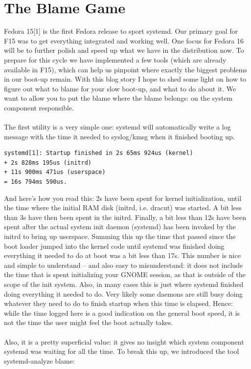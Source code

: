 \documentclass[titlepage]{article}
\begin{document}
\section{The Blame Game}
Fedora 15[1] is the first Fedora release to sport systemd. Our primary goal for F15 was to get everything integrated and working well. One focus for Fedora 16 will be to further polish and speed up what we have in the distribution now. To prepare for this cycle we have implemented a few tools (which are already available in F15), which can help us pinpoint where exactly the biggest problems in our boot-up remain. With this blog story I hope to shed some light on how to figure out what to blame for your slow boot-up, and what to do about it. We want to allow you to put the blame where the blame belongs: on the system component responsible.
\\
\\
The first utility is a very simple one: systemd will automatically write a log message with the time it needed to syslog/kmsg when it finished booting up.
\begin{lstlisting}
systemd[1]: Startup finished in 2s 65ms 924us (kernel) 
+ 2s 828ms 195us (initrd) 
+ 11s 900ms 471us (userspace) 
= 16s 794ms 590us.
\end{lstlisting}
And here's how you read this: 2s have been spent for kernel initialization, until the time where the initial RAM disk (initrd, i.e. dracut) was started. A bit less than 3s have then been spent in the initrd. Finally, a bit less than 12s have been spent after the actual system init daemon (systemd) has been invoked by the initrd to bring up userspace. Summing this up the time that passed since the boot loader jumped into the kernel code until systemd was finished doing everything it needed to do at boot was a bit less than 17s. This number is nice and simple to understand -- and also easy to misunderstand: it does not include the time that is spent initializing your GNOME session, as that is outside of the scope of the init system. Also, in many cases this is just where systemd finished doing everything it needed to do. Very likely some daemons are still busy doing whatever they need to do to finish startup when this time is elapsed. Hence: while the time logged here is a good indication on the general boot speed, it is not the time the user might feel the boot actually takes.
\\
\\
Also, it is a pretty superficial value: it gives no insight which system component systemd was waiting for all the time. To break this up, we introduced the tool systemd-analyze blame:
\end{document}
